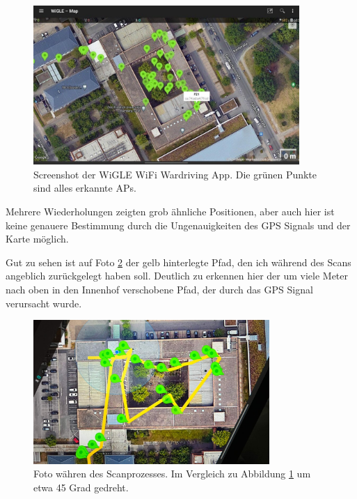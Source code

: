 \begin{figure}[h]
    \centering
    \includegraphics[width=0.9\textwidth]{figures/screen-wardriving.jpg}
    \caption{Screenshot der WiGLE WiFi Wardriving App. Die grünen Punkte sind alles erkannte APs.}
    \label{screen-wardriving}
\end{figure}

Mehrere Wiederholungen zeigten grob ähnliche Positionen, aber auch hier ist keine genauere Bestimmung durch die Ungenauigkeiten des GPS Signals und der Karte möglich.

Gut zu sehen ist auf Foto \ref{screen-wardriving-path} der gelb hinterlegte Pfad, den ich während des Scans angeblich zurückgelegt haben soll. Deutlich zu erkennen hier der um viele Meter nach oben in den Innenhof verschobene Pfad, der durch das GPS Signal verursacht wurde.

\begin{figure}[h]
    \centering
    \includegraphics[width=0.8\textwidth]{figures/screen-wardriving-path.jpg}
    \caption{Foto währen des Scanprozesses. Im Vergleich zu Abbildung \ref{screen-wardriving} um etwa 45 Grad gedreht.}
    \label{screen-wardriving-path}
\end{figure}
